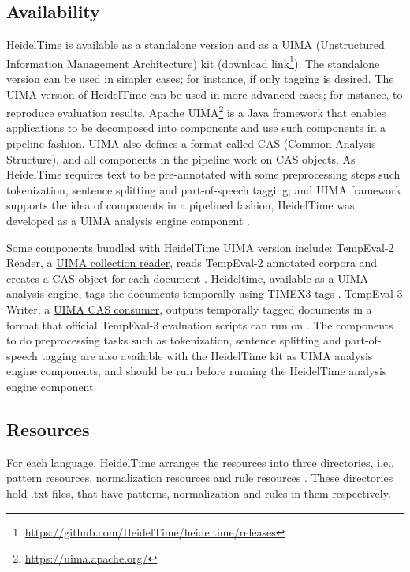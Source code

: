 \subsection{Availability}
HeidelTime is available as a standalone version and as a UIMA (Unstructured Information Management Architecture) kit (download link\footnote{\url{https://github.com/HeidelTime/heideltime/releases}}). The standalone version can be used in simpler cases; for instance, if only tagging is desired. The UIMA version of HeidelTime can be used in more advanced cases; for instance, to reproduce evaluation results. Apache UIMA\footnote{\url{https://uima.apache.org/}} is a Java framework that enables applications to be decomposed into components and use such components in a pipeline fashion. UIMA also defines a format called CAS (Common Analysis Structure), and all components in the pipeline work on CAS objects. As HeidelTime requires text to be pre-annotated with some preprocessing steps such tokenization, sentence splitting and part-of-speech tagging; and UIMA framework supports the idea of components in a pipelined fashion, HeidelTime was developed as a UIMA analysis engine component \cite{DBLP:phd/de/Strotgen15}. 

Some components bundled with HeidelTime UIMA version include: TempEval-2 Reader, a \ul{UIMA collection reader}, reads TempEval-2 annotated corpora and creates a CAS object for each document \cite{DBLP:phd/de/Strotgen15}. Heideltime, available as a \ul{UIMA analysis engine}, tags the documents temporally using TIMEX3 tags \cite{DBLP:phd/de/Strotgen15}. TempEval-3 Writer, a \ul{UIMA CAS consumer}, outputs temporally tagged documents in a format that official TempEval-3 evaluation scripts can run on \cite{DBLP:phd/de/Strotgen15}. The components to do preprocessing tasks such as tokenization, sentence splitting and part-of-speech tagging are also available with the HeidelTime kit as UIMA analysis engine components, and should be run before running the HeidelTime analysis engine component. 

\subsection{Resources}
For each language, HeidelTime arranges the resources into three directories, i.e., pattern resources, normalization resources and rule resources \cite{DBLP:phd/de/Strotgen15}. These directories hold .txt files, that have patterns, normalization and rules in them respectively.  

